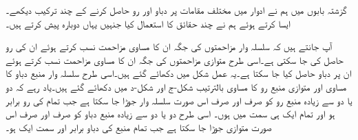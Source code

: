 گزشتہ بابوں میں ہم نے ادوار میں مختلف مقامات پر دباو اور رو حاصل کرنے کے چند ترکیب دیکھے۔ایسا کرتے ہوئے ہم نے چند حقائق کا استعمال کیا جنہیں یہاں دوبارہ پیش کرتے ہیں۔

آپ جانتے ہیں کہ سلسلہ وار مزاحمتوں  کی جگہ ان کا مساوی مزاحمت نسب کرتے ہوئے ان کی رو حاصل کی جا سکتی ہے۔اسی طرح متوازی مزاحمتوں کی جگہ ان کا مساوی مزاحمت نسب کرتے ہوئے ان  پر دباو حاصل کیا جا سکتا ہے۔یہ عمل شکل  میں دکھائے گئے ہیں۔اسی طرح سلسلہ وار منبع دباو کا مساوی اور متوازی منبع رو کا مساوی بالترتیب شکل-ج اور شکل-د میں دکھائے گئے ہیں۔یاد رہے کہ دو یا دو سے زیادہ منبع رو کو صرف اور صرف اس صورت سلسلہ وار جوڑا جا سکتا ہے جب تمام کی رو برابر ہو اور تمام  ایک ہی سمت میں ہوں۔ اسی طرح دو یا دو سے زیادہ منبع دباو کو صرف اور صرف اس صورت متوازی جوڑا جا سکتا ہے جب تمام منبع کی دباو برابر اور سمت ایک ہو۔

